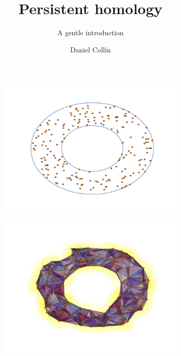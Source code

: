 \documentclass[10pt]{beamer}
\title{Persistent homology}
\subtitle{A gentle introduction}
\date{}
\author{Daniel Collin}
\begin{document}
\begin{frame}[fragile]{}
\begin{figure}[ht]
  \centering
  \begin{subfigure}[t]{.5\linewidth}
    \includegraphics[scale=.35]{annulus.pdf}
    \caption{\label{annulus:points}}
 \end{subfigure}%
  \begin{subfigure}[t]{.5\linewidth}
    \includegraphics[scale=.35]{annulus_rips.pdf}
    \caption{\label{annulus:imposed}}
 \end{subfigure}
\end{figure}

\end{frame}
\end{document}
